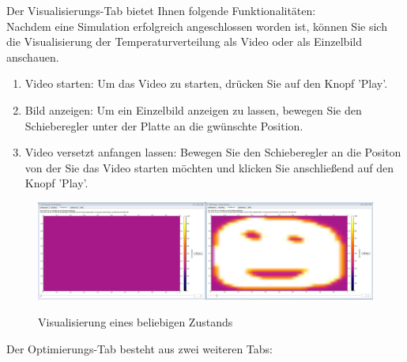 \newpage
\noindent
Der Visualisierungs-Tab bietet Ihnen folgende Funktionalitäten:\\
Nachdem eine Simulation erfolgreich angeschlossen worden ist, können Sie sich die Visualisierung der Temperaturverteilung als Video oder als Einzelbild anschauen.
\begin{enumerate}
\item Video starten: Um das Video zu starten, drücken Sie auf den Knopf 'Play'.
\item Bild anzeigen: Um ein Einzelbild anzeigen zu lassen, bewegen Sie den Schieberegler unter der Platte an die gwünschte Position.
\item Video versetzt anfangen lassen: Bewegen Sie den Schieberegler an die Positon von der Sie das Video starten möchten und klicken Sie anschließend auf den Knopf 'Play'.
\end{enumerate}
\begin{figure}[H]
\centering
\includegraphics[scale=.25]{Benutzerdokumentation/Visualisieren.png}\\
\caption{Visualisierung eines beliebigen Zustands}
\label{Visualisieren}
\end{figure}


\newpage
\noindent
Der Optimierungs-Tab besteht aus zwei weiteren Tabs:\\

